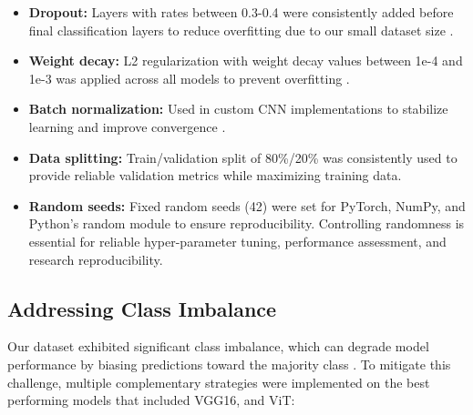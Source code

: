 \documentclass[a4paper,12pt]{report}
\begin{document}
\begin{itemize}
    \item \textbf{Dropout:} Layers with rates between 0.3-0.4 were consistently added before final classification layers to reduce overfitting due to our small dataset size \citep{srivastava2014dropout}.
    \item \textbf{Weight decay:} L2 regularization with weight decay values between 1e-4 and 1e-3 was applied across all models to prevent overfitting \citep{krogh1992simple}.
    \item \textbf{Batch normalization:} Used in custom CNN implementations to stabilize learning and improve convergence \citep{ioffe2015batch}.
    \item \textbf{Data splitting:} Train/validation split of 80\%/20\% was consistently used to provide reliable validation metrics while maximizing training data.
    \item \textbf{Random seeds:} Fixed random seeds (42) were set for PyTorch, NumPy, and Python's random module to ensure reproducibility. Controlling randomness is essential for reliable hyper-parameter tuning, performance assessment, and research reproducibility.
\end{itemize}

\subsection{Addressing Class Imbalance}

Our dataset exhibited significant class imbalance, which can degrade model performance by biasing predictions toward the majority class \citep{krawczyk2016learning}. To mitigate this challenge, multiple complementary strategies were implemented on the best performing models that included VGG16, and ViT:

\end{document}

